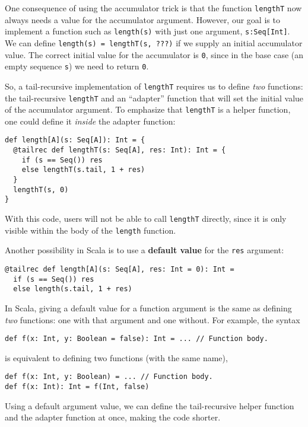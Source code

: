 One consequence of using the accumulator trick is that the function
\lstinline!lengthT! now
always needs a value for the accumulator argument. However, our goal
is to implement a function such as \lstinline!length(s)!
with just one argument, \lstinline!s:Seq[Int]!.
We can define \lstinline!length(s) = lengthT(s, ???)!
if we supply an initial accumulator value. The correct initial value
for the accumulator is \lstinline!0!,
since in the base case (an empty sequence \lstinline!s!)
we need to return \lstinline!0!.

So, a tail-recursive implementation of \lstinline!lengthT!
requires us to define \emph{two} functions: the tail-recursive \lstinline!lengthT!
and an ``adapter'' function that will set the initial value of the
accumulator argument. To emphasize that \lstinline!lengthT!
is a helper function, one could define it \emph{inside} the adapter
function:
\begin{lstlisting}
def length[A](s: Seq[A]): Int = {
  @tailrec def lengthT(s: Seq[A], res: Int): Int = {
    if (s == Seq()) res
    else lengthT(s.tail, 1 + res)
  }
  lengthT(s, 0)
}
\end{lstlisting}
With this code, users will not be able to call \lstinline!lengthT!
directly, since it is only visible within the body of the \lstinline!length!
function.

Another possibility in Scala is to use a \textbf{default value}
for the \lstinline!res!
argument:
\begin{lstlisting}
@tailrec def length[A](s: Seq[A], res: Int = 0): Int = 
  if (s == Seq()) res
  else length(s.tail, 1 + res)
\end{lstlisting}
In Scala, giving a default value for a function argument is the same
as defining \emph{two} functions: one with that argument and one without.
For example, the syntax
\begin{lstlisting}
def f(x: Int, y: Boolean = false): Int = ... // Function body.
\end{lstlisting}
is equivalent to defining two functions (with the same name),
\begin{lstlisting}
def f(x: Int, y: Boolean) = ... // Function body.
def f(x: Int): Int = f(Int, false)
\end{lstlisting}
Using a default argument value, we can define the tail-recursive helper
function and the adapter function at once, making the code shorter.

